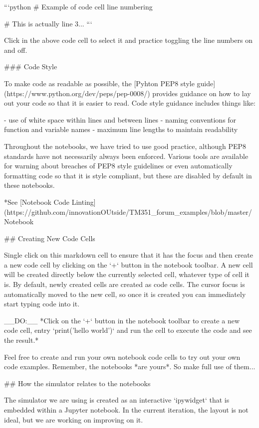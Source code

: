 \documentclass[letterpaper,10pt,english]{sphinxmanual}
\begin{document}
```python
# Example of code cell line numbering

# This is actually line 3...
```

Click in the above code cell to select it and practice toggling the line numbers on and off.


### Code Style

To make code as readable as possible, the [Pyhton PEP8 style guide](https://www.python.org/dev/peps/pep-0008/) provides guidance on how to lay out your code so that it is easier to read. Code style guidance includes things like:

 - use of white space within lines and between lines
 - naming conventions for function and variable names
 - maximum line lengths to maintain readability

Throughout the notebooks, we have tried to use good practice, although PEP8 standards have not necessarily always been enforced. Various tools are available for warning about breaches of PEP8 style guidelines or even automatically formatting code so that it is style compliant, but these are disabled by default in these notebooks.

*See [Notebook Code Linting](https://github.com/innovationOUtside/TM351_forum_examples/blob/master/Notebook%


## Creating New Code Cells

Single click on this markdown cell to ensure that it has the focus and then create a new code cell by clicking on the `+` button in the notebook toolbar. A new cell will be created directly below the currently selected cell, whatever type of cell it is. By default, newly created cells are created as code cells. The cursor focus is automatically moved to the new cell, so once it is created you can immediately start typing code into it.

__DO:__ *Click on the `+` button in the notebook toolbar to create a new code cell, entry `print('hello world')` and run the cell to execute the code and see the result.*

Feel free to create and run your own notebook code cells to try out your own code examples. Remember, the notebooks *are yours*. So make full use of them...


## How the simulator relates to the notebooks

The simulator we are using is created as an interactive `ipywidget` that is embedded within a Jupyter notebook. In the current iteration, the layout is not ideal, but we are working on improving on it.
\end{document}
